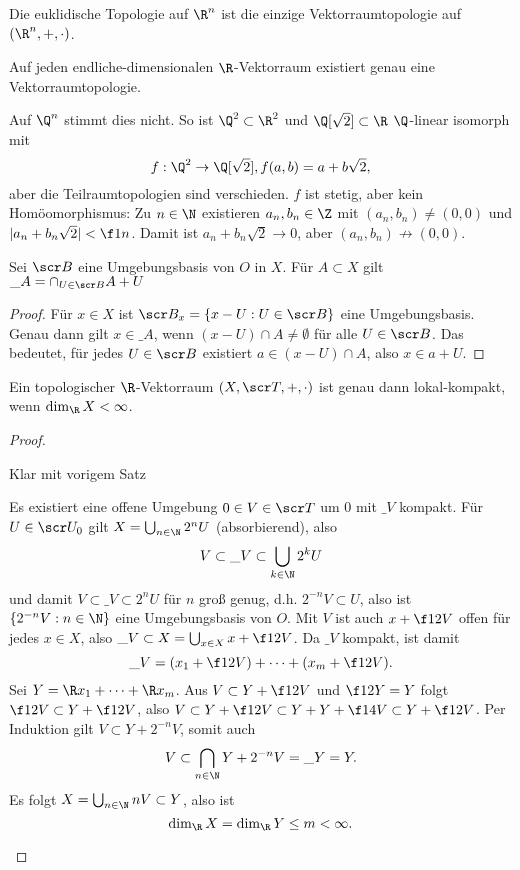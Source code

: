 \begin{kor}
	Die euklidische Topologie auf $\R^n$ ist die einzige Vektorraumtopologie auf $(\R^n, +, \cdot)$.

	Auf jeden endliche-dimensionalen $\R$-Vektorraum existiert genau eine Vektorraumtopologie.
	\begin{note}
		Auf $\Q^n$ stimmt dies nicht.
		So ist $\Q^2 \subset \R^2$ und $\Q[\sqrt 2] \subset \R$ $\Q$-linear isomorph mit
		\[
			f: \Q^2 \to \Q[\sqrt 2], f(a,b) = a + b \sqrt{2},
		\]
		aber die Teilraumtopologien sind verschieden.
		$f$ ist stetig, aber kein Homöomorphismus:
		Zu $n \in \N$ existieren $a_n, b_n \in \Z$ mit $(a_n, b_n) \neq (0,0)$ und $|a_n + b_n \sqrt{2}| < \f 1n$.
		Damit ist $a_n + b_n \sqrt{2} \to 0$, aber $(a_n, b_n) \not\to (0,0)$.
	\end{note}
\end{kor}

\begin{lem}
	Sei $\scr B$ eine Umgebungsbasis von $O$ in $X$.
	Für $A \subset X$ gilt $\_A = \cap_{U \in \scr B} A + U$
	\begin{proof}
		Für $x \in X$ ist $\scr B_x = \{ x - U : U \in \scr B\}$ eine Umgebungsbasis.
		Genau dann gilt $x \in \_A$, wenn $(x-U) \cap A \neq \emptyset$ für alle $U \in \scr B$.
		Das bedeutet, für jedes $U \in \scr B$ existiert $a \in (x-U) \cap A$, also $x \in a + U$.
	\end{proof}
\end{lem}

\begin{st}
	Ein topologischer $\R$-Vektorraum $(X, \scr T, +, \cdot)$ ist genau dann lokal-kompakt, wenn $\dim_{\R} X < \infty$.
	\begin{proof}
		\begin{segnb}[„$\impliedby$“]
			Klar mit vorigem Satz
		\end{segnb}
		\begin{segnb}[„$\implies$“]
			Es existiert eine offene Umgebung $0 \in V \in \scr T$ um $0$ mit $\_V$ kompakt.
			Für $U \in \scr U_0$ gilt $X = \bigcup_{n\in\N} 2^n U$ (absorbierend), also
			\[
				V \subset \_V \subset \bigcup_{k\in\N}2^k U
			\]
			und damit $V \subset \_V \subset 2^n U$ für $n$ groß genug, d.h. $2^{-n} V \subset U$, also ist $\{2^{-n} V : n\in \N\}$ eine Umgebungsbasis von $O$.
			Mit $V$ ist auch $x + \f 12 V$ offen für jedes $x \in X$, also $\_V \subset X = \bigcup_{x\in X} x + \f 12 V$.
			Da $\_V$ kompakt, ist damit
			\[
				\_V = (x_1 + \f 12 V) + \dotsb + (x_m + \f 12 V).
			\]
			Sei $Y = \R x_1 + \dotsb + \R x_m$.
			Aus $V \subset Y + \f 12 V$ und $\f 12 Y = Y$ folgt $\f 12 V \subset Y + \f 12 V$, also $V \subset Y + \f 12 V \subset Y + Y + \f 14 V \subset Y + \f 12 V$.
			Per Induktion gilt $V \subset Y + 2^{-n}V$, somit auch
			\[
				V
				\subset \bigcap_{n\in\N} Y + 2^{-n} V
				= \_Y
				= Y.
			\]
			Es folgt $X = \bigcup_{n\in\N} nV \subset Y$, also ist
			\[
				\dim_{\R} X = \dim_{\R} Y \le m < \infty.
			\]
		\end{segnb}
	\end{proof}
\end{st}


